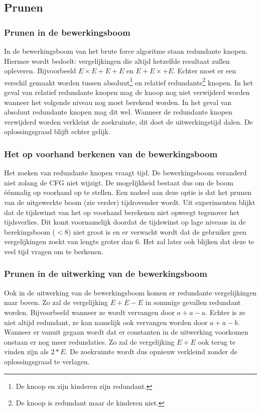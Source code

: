 \documentclass[Main.tex]{subfiles}
\begin{document}
\subsection{Prunen} \label{ssec:Prunen}
\subsubsection*{Prunen in de bewerkingsboom}
In de bewerkingsboom van het brute force algoritme staan redundante knopen. Hiermee wordt bedoelt: vergelijkingen die altijd hetzelfde resultaat zullen opleveren. Bijvoorbeeld $E \times E+E+E$ en $E+E \times +E$. Echter moet er een verschil gemaakt worden tussen absoluut\footnote{\label{note:absoluut}De knoop en zijn kinderen zijn redundant.} en relatief redundante\footnote{\label{note:relatief}De knoop is redundant maar de kinderen niet.} knopen.
In het geval van relatief redundante knopen mag de knoop nog niet verwijderd worden wanneer het volgende niveau nog moet berekend worden. In het geval van absoluut redundante knopen mag dit wel. Wanneer de redundante knopen verwijderd worden verkleint de zoekruimte, dit doet de uitwerkingstijd dalen. De oplossingsgraad blijft echter gelijk.
\subsubsection*{Het op voorhand berkenen van de bewerkingsboom}
Het zoeken van redundante knopen vraagt tijd. De bewerkingsboom veranderd niet zolang de CFG niet wijzigt. De mogelijkheid bestaat dus om de boom \'e\'enmalig op voorhand op te stellen. Een nadeel aan deze optie is dat het prunen van de uitgewerkte boom (zie verder) tijdrovender wordt. Uit experimenten blijkt dat de tijdswinst van het op voorhand berekenen niet opweegt tegenover het tijdsverlies. Dit komt voornamelijk doordat de tijdswinst op lage niveaus in de berekingsboom ($< 8$) niet groot is en er verwacht wordt dat de gebruiker geen vergelijkingen zoekt van lengte groter dan 6. Het zal later ook blijken dat deze te veel tijd vragen om te berkenen. 
\subsubsection*{Prunen in de uitwerking van de bewerkingsboom}
Ook in de uitwerking van de bewerkingsboom komen er redundante vergelijkingen naar boven. Zo zal de vergelijking $E+E-E$ in sommige gevallen redundant worden. Bijvoorbeeld wanneer ze wordt vervangen door $a+a-a$. Echter is ze niet altijd redundant, ze kan namelijk ook vervangen worden door $a+a-b$. Wanneer er vanuit gegaan wordt dat er constanten in de uitwerking voorkomen onstaan er nog meer redundaties. Zo zal de vergelijking $E+E$ ook terug te vinden zijn als $2*E$. De zoekruimte wordt dus opnieuw verkleind zonder de oplossingsgraad te verlagen.
\end{document}

